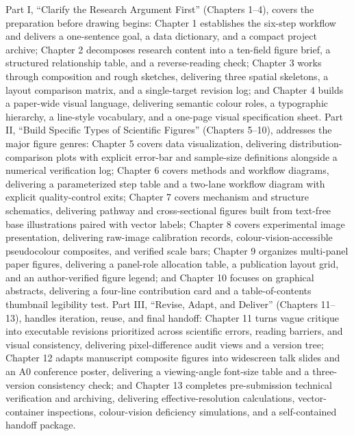 Part I, ``Clarify the Research Argument First'' (Chapters 1--4), covers the preparation before drawing begins: Chapter 1 establishes the six-step workflow and delivers a one-sentence goal, a data dictionary, and a compact project archive; Chapter 2 decomposes research content into a ten-field figure brief, a structured relationship table, and a reverse-reading check; Chapter 3 works through composition and rough sketches, delivering three spatial skeletons, a layout comparison matrix, and a single-target revision log; and Chapter 4 builds a paper-wide visual language, delivering semantic colour roles, a typographic hierarchy, a line-style vocabulary, and a one-page visual specification sheet. Part II, ``Build Specific Types of Scientific Figures'' (Chapters 5--10), addresses the major figure genres: Chapter 5 covers data visualization, delivering distribution-comparison plots with explicit error-bar and sample-size definitions alongside a numerical verification log; Chapter 6 covers methods and workflow diagrams, delivering a parameterized step table and a two-lane workflow diagram with explicit quality-control exits; Chapter 7 covers mechanism and structure schematics, delivering pathway and cross-sectional figures built from text-free base illustrations paired with vector labels; Chapter 8 covers experimental image presentation, delivering raw-image calibration records, colour-vision-accessible pseudocolour composites, and verified scale bars; Chapter 9 organizes multi-panel paper figures, delivering a panel-role allocation table, a publication layout grid, and an author-verified figure legend; and Chapter 10 focuses on graphical abstracts, delivering a four-line contribution card and a table-of-contents thumbnail legibility test. Part III, ``Revise, Adapt, and Deliver'' (Chapters 11--13), handles iteration, reuse, and final handoff: Chapter 11 turns vague critique into executable revisions prioritized across scientific errors, reading barriers, and visual consistency, delivering pixel-difference audit views and a version tree; Chapter 12 adapts manuscript composite figures into widescreen talk slides and an A0 conference poster, delivering a viewing-angle font-size table and a three-version consistency check; and Chapter 13 completes pre-submission technical verification and archiving, delivering effective-resolution calculations, vector-container inspections, colour-vision deficiency simulations, and a self-contained handoff package.

